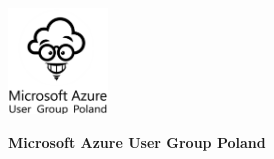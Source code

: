 \documentclass[\main/boa.tex]{subfiles}
\begin{document}
	
	\begin{minipage}[t]{0.915\textwidth}
		\center     
		\includegraphics[width=100px]{img/logos.bw/microsoft_azure.png} 
	\end{minipage}
	
	\Large \textbf {Microsoft Azure User Group Poland}
	
	
	\vskip 0.3cm
	\normalsize 

	\vskip 1.5cm
\end{document}
